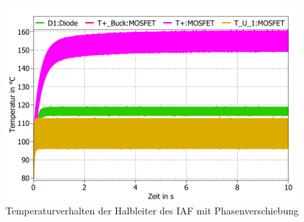 		\begin{figure} 
			\centering
			\includegraphics[width=0.9\linewidth]{content/Grafiken/IAF_Temp_30Grad}
			\caption{Temperaturverhalten der Halbleiter des IAF mit  Phasenverschiebung}
			\label{fig:iaftemp30}
		\end{figure}
		
